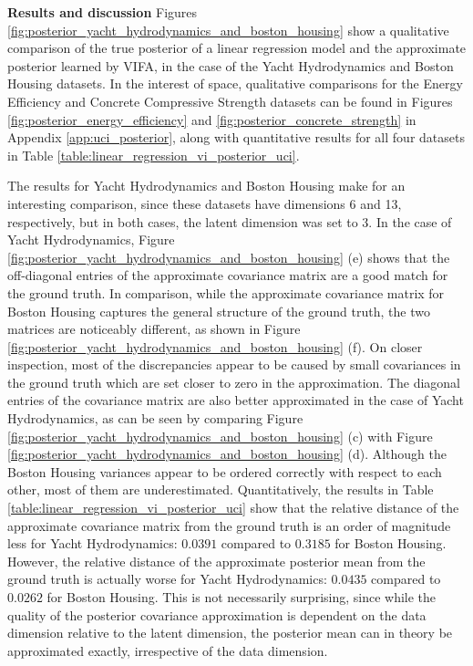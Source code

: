 \documentclass[10pt]{article} %
\begin{document}
\textbf{Results and discussion}
Figures \ref{fig:posterior_yacht_hydrodynamics_and_boston_housing} show a qualitative comparison of the true posterior of a linear regression model and the approximate posterior learned by VIFA, in the case of the Yacht Hydrodynamics and Boston Housing datasets. In the interest of space, qualitative comparisons for the Energy Efficiency and Concrete Compressive Strength datasets can be found in Figures \ref{fig:posterior_energy_efficiency} and \ref{fig:posterior_concrete_strength} in Appendix \ref{app:uci_posterior}, along with quantitative results for all four datasets in Table \ref{table:linear_regression_vi_posterior_uci}.

The results for Yacht Hydrodynamics and Boston Housing make for an interesting comparison, since these datasets have dimensions 6 and 13, respectively, but in both cases, the latent dimension was set to 3. In the case of Yacht Hydrodynamics, Figure \ref{fig:posterior_yacht_hydrodynamics_and_boston_housing} (e) shows that the off-diagonal entries of the approximate covariance matrix are a good match for the ground truth. In comparison, while the approximate covariance matrix for Boston Housing captures the general structure of the ground truth, the two matrices are noticeably different, as shown in Figure \ref{fig:posterior_yacht_hydrodynamics_and_boston_housing} (f). On closer inspection, most of the discrepancies appear to be caused by small covariances in the ground truth which are set closer to zero in the approximation. The diagonal entries of the covariance matrix are also better approximated in the case of Yacht Hydrodynamics, as can be seen by comparing Figure \ref{fig:posterior_yacht_hydrodynamics_and_boston_housing} (c) with Figure \ref{fig:posterior_yacht_hydrodynamics_and_boston_housing} (d). Although the Boston Housing variances appear to be ordered correctly with respect to each other, most of them are underestimated. Quantitatively, the results in Table \ref{table:linear_regression_vi_posterior_uci} show that the relative distance of the approximate covariance matrix from the ground truth is an order of magnitude less for Yacht Hydrodynamics: $0.0391$ compared to $0.3185$ for Boston Housing. However, the relative distance of the approximate posterior mean from the ground truth is actually worse for Yacht Hydrodynamics: $0.0435$ compared to $0.0262$ for Boston Housing. This is not necessarily surprising, since while the quality of the posterior covariance approximation is dependent on the data dimension relative to the latent dimension, the posterior mean can in theory be approximated exactly, irrespective of the data dimension. 
\end{document}
